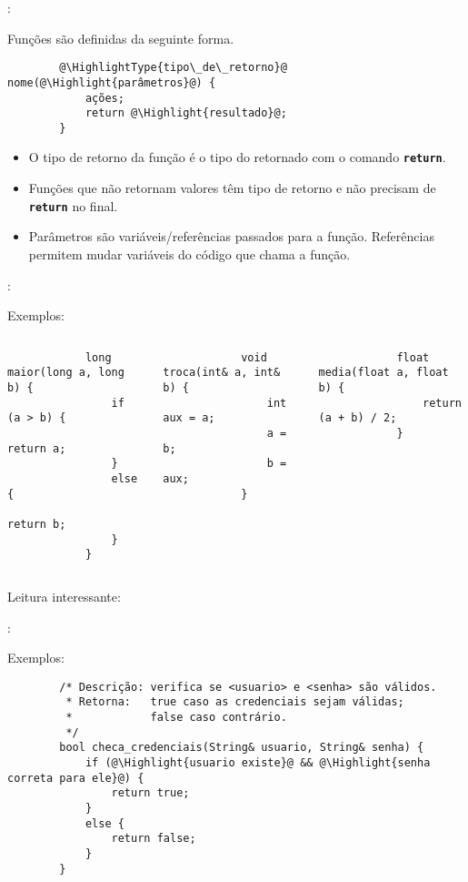 \begin{frame}[fragile]{\insertsection: \insertsubsection}

	Funções são definidas da seguinte forma.
	\begin{verbatim}
		@\HighlightType{tipo\_de\_retorno}@ nome(@\Highlight{parâmetros}@) {
			ações;
			return @\Highlight{resultado}@;
		}
	\end{verbatim}

	\begin{itemize}
		\item O tipo de retorno da função é o tipo do  retornado com o comando \texttt{\textbf{return}}.
		\item Funções que não retornam valores têm tipo de retorno  e não precisam de \texttt{\textbf{return}} no final.
		\item Parâmetros são variáveis/referências passados para a função. Referências permitem mudar variáveis do código que chama a função.
	\end{itemize}

\end{frame}


\begin{frame}[b,fragile]{\insertsection: \insertsubsection}

	Exemplos:
	\begin{columns}[t]
		\begin{verbatim}
			long maior(long a, long b) {
				if (a > b) {
					return a;
				}
				else {
					return b;
				}
			}
		\end{verbatim}

		\begin{verbatim}
			void troca(int& a, int& b) {
				int aux = a;
				a = b;
				b = aux;
			}
		\end{verbatim}

		\vspace{-\medskipamount}
		\begin{verbatim}
			float media(float a, float b) {
				return (a + b) / 2;
			}
		\end{verbatim}
	\end{columns}

	\vfill
	Leitura interessante: 

\end{frame}


\begin{frame}[fragile]{\insertsection: \insertsubsection}

	Exemplos:
	\begin{verbatim}
		/* Descrição: verifica se <usuario> e <senha> são válidos.
		 * Retorna:   true caso as credenciais sejam válidas;
		 *            false caso contrário.
		 */
		bool checa_credenciais(String& usuario, String& senha) {
			if (@\Highlight{usuario existe}@ && @\Highlight{senha correta para ele}@) {
				return true;
			}
			else {
				return false;
			}
		}
	\end{verbatim}

\end{frame}


